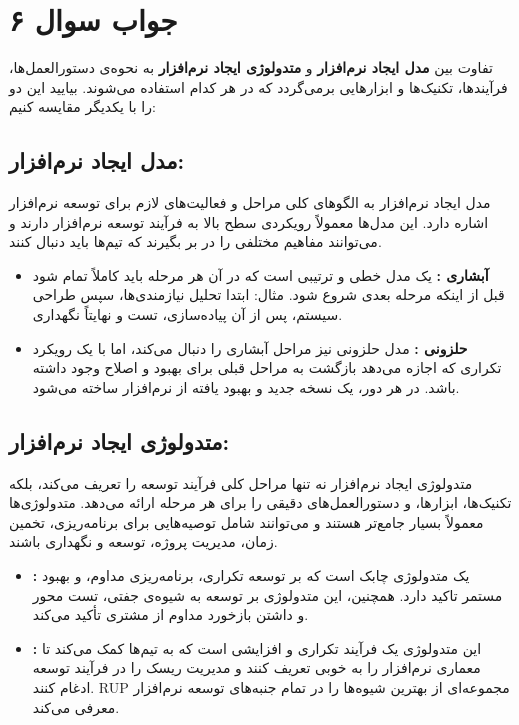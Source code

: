 \section*{جواب سوال ۶}

تفاوت بین
\textbf{مدل ایجاد نرم‌افزار}
و
\textbf{متدولوژی ایجاد نرم‌افزار}
به نحوه‌ی دستورالعمل‌ها، فرآیندها، تکنیک‌ها و ابزارهایی برمی‌گردد که در هر کدام استفاده می‌شوند. بیایید این دو را با یکدیگر مقایسه کنیم:

\subsection*{مدل ایجاد نرم‌افزار:}

مدل ایجاد نرم‌افزار به الگوهای کلی مراحل و فعالیت‌های لازم برای توسعه نرم‌افزار اشاره دارد. این مدل‌ها معمولاً رویکردی سطح بالا به فرآیند توسعه نرم‌افزار دارند و می‌توانند مفاهیم مختلفی را در بر بگیرند که تیم‌ها باید دنبال کنند.

\begin{itemize}
	\item \textbf{آبشاری  :}
یک مدل خطی و ترتیبی است که در آن هر مرحله باید کاملاً تمام شود قبل از اینکه مرحله بعدی شروع شود. مثال: ابتدا تحلیل نیازمندی‌ها، سپس طراحی سیستم، پس از آن پیاده‌سازی، تست و نهایتاً نگهداری.
	\item \textbf{حلزونی  :}
مدل حلزونی نیز مراحل آبشاری را دنبال می‌کند، اما با یک رویکرد تکراری که اجازه می‌دهد بازگشت به مراحل قبلی برای بهبود و اصلاح وجود داشته باشد. در هر دور، یک نسخه جدید و بهبود یافته از نرم‌افزار ساخته می‌شود.
\end{itemize}

\subsection*{متدولوژی ایجاد نرم‌افزار:}

متدولوژی ایجاد نرم‌افزار نه تنها مراحل کلی فرآیند توسعه را تعریف می‌کند، بلکه تکنیک‌ها، ابزارها، و دستورالعمل‌های دقیقی را برای هر مرحله ارائه می‌دهد. متدولوژی‌ها معمولاً بسیار جامع‌تر هستند و می‌توانند شامل توصیه‌هایی برای برنامه‌ریزی، تخمین زمان، مدیریت پروژه، توسعه و نگهداری باشند.

\begin{itemize}
	\item \textbf{ :}
یک متدولوژی چابک است که بر توسعه تکراری، برنامه‌ریزی مداوم، و بهبود مستمر تاکید دارد. همچنین، این متدولوژی بر توسعه به شیوه‌ی جفتی، تست محور و داشتن بازخورد مداوم از مشتری تأکید می‌کند.

	\item \textbf{ :}
این متدولوژی یک فرآیند تکراری و افزایشی است که به تیم‌ها کمک می‌کند تا معماری نرم‌افزار را به خوبی تعریف کنند و مدیریت ریسک را در فرآیند توسعه ادغام کنند. RUP مجموعه‌ای از بهترین شیوه‌ها را در تمام جنبه‌های توسعه نرم‌افزار معرفی می‌کند.
\end{itemize}

